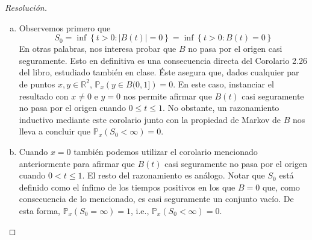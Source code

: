 \documentclass[a4paper,11pt]{article}
\newcommand{\abs}[1]{\ensuremath{\left\lvert #1 \right\rvert}}
\newcommand{\Probx}[2]{\ensuremath{\mathbb{P}_{#1} \left( #2 \right)}}
\begin{document}
\begin{proof}[Resoluci\'on]
\begin{enumerate}[a.]
    \item Observemos primero que
    $$S_0 = \inf \left\{ t > 0 : \abs{B(t)} = 0 \right\}
          = \inf \left\{ t > 0 : B(t) = 0 \right\}$$
    En otras palabras, nos interesa probar que $B$ no pasa por el origen casi seguramente. Esto 
    en definitiva es una consecuencia directa del Corolario 2.26 del libro, estudiado también en 
    clase. Éste asegura que, dados cualquier par de puntos $x, y \in \mathbb{R}^2$,
    $\Probx{x}{y \in B(0,1]} = 0$. En este caso, instanciar el resultado con $x \neq 0$ e $y = 0$
    nos permite afirmar que $B(t)$ casi seguramente no pasa por el origen cuando
    $0 \leq t \leq 1$. No obstante, un razonamiento inductivo mediante este corolario junto con la
    propiedad de Markov de $B$ nos lleva a concluir que $\Probx{x}{S_0 < \infty} = 0$.

    \item Cuando $x = 0$ también podemos utilizar el corolario mencionado anteriormente para
    afirmar que $B(t)$ casi seguramente no pasa por el origen cuando $0 < t \leq 1$. El resto
    del razonamiento es análogo. Notar que $S_0$ está definido como el ínfimo de los tiempos
    positivos en los que $B = 0$ que, como consecuencia de lo mencionado, es casi seguramente
    un conjunto vacío. De esta forma, $\Probx{x}{S_0 = \infty} = 1$, i.e., $\Probx{x}{S_0 < \infty} = 0$.
\end{enumerate}
\end{proof}
\end{document}
